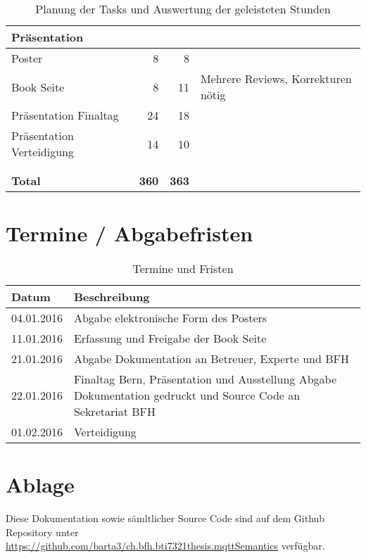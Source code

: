 \begin{table}[H]
\begin{tabularx}{\textwidth}{|l|r|r|X|}
 \textbf{Präsentation}              &      &       &   \\ \hline
 Poster                             &   8  &   8   &   \\ \hline
 Book Seite                         &   8  &  11   &  Mehrere Reviews, Korrekturen nötig\\ \hline
 Präsentation Finaltag              &  24  &  18   &   \\ \hline
 Präsentation Verteidigung          &  14  &  10   &   \\ \hline
     &      &       &   \\ \hline
     &      &       &   \\ \hline
 \textbf{Total}                     & \textbf{360}  &  \textbf{363}     &   \\ \hline

\end{tabularx}
\caption{Planung der Tasks und Auswertung der geleisteten Stunden}
\end{table}


\section{Termine / Abgabefristen}
\begin{table}[H]
\begin{tabularx}{\textwidth}{|l|X|}

 \hline \rowcolor{lightgray}
 {\bf Datum } & {\bf Beschreibung } \\  \hline
 04.01.2016   & Abgabe elektronische Form des Posters  \\ \hline
 11.01.2016   & Erfassung und Freigabe der Book Seite  \\ \hline
 21.01.2016   & Abgabe Dokumentation an Betreuer, Experte und BFH  \\ \hline
 22.01.2016   & Finaltag Bern, Präsentation und Ausstellung \newline
                Abgabe Dokumentation gedruckt und Source Code an Sekretariat BFH  \\ \hline
 01.02.2016   & Verteidigung \\ \hline

\end{tabularx}
\caption{Termine und Fristen}
\end{table}

\section{Ablage}
Diese Dokumentation sowie sämltlicher Source Code sind auf dem Github Repository unter \\ \url{https://github.com/barta3/ch.bfh.bti7321thesis.mqttSemantics} verfügbar.


